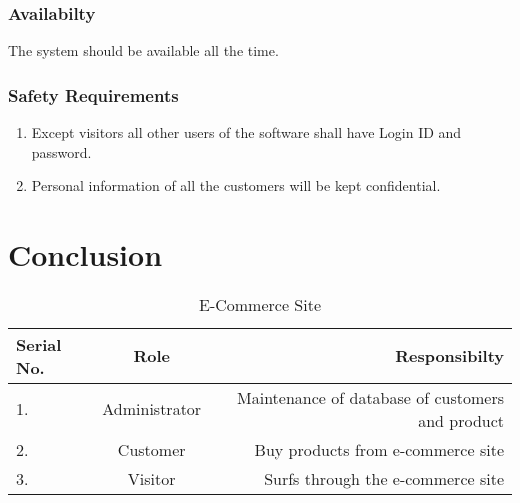 \documentclass{article}
\begin{document}
\subsubsection{Availabilty}
The system should be available all the time.
\subsubsection{Safety Requirements}
\begin{enumerate}
\item Except visitors all other users of the software shall have Login ID and password.
\item Personal information of all the customers will be kept confidential.
\end{enumerate}



\section{Conclusion}
\begin{table}[h!]
\begin{center}
\caption{E-Commerce Site}
\label{tab:table1}
\begin{tabular}{|l|c|r|}
\hline
\textbf{Serial No.}&\textbf{Role}&\textbf{Responsibilty}\\
\hline
1.  &Administrator &Maintenance of database of customers and product\\
2. &Customer &Buy products from e-commerce site\\
3. &Visitor &Surfs through the e-commerce site\\
\hline
\end{tabular}
\end{center}
\end{table}
\newpage
\end{document}
